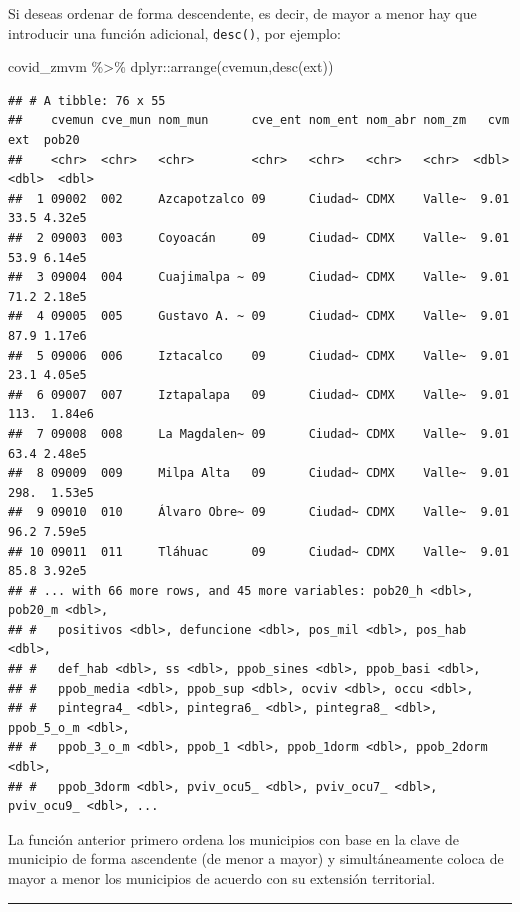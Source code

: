 \documentclass[
  11pt,
  oneside]{book}
\newenvironment{Shaded}{\begin{snugshade}}{\end{snugshade}}
\newcommand{\FunctionTok}[1]{\textcolor[rgb]{0.00,0.00,0.00}{#1}}
\newcommand{\NormalTok}[1]{#1}
\newcommand{\SpecialCharTok}[1]{\textcolor[rgb]{0.00,0.00,0.00}{#1}}
\begin{document}
Si deseas ordenar de forma descendente, es decir, de mayor a menor hay que introducir una función adicional, \texttt{desc()}, por ejemplo:

\begin{Shaded}
\begin{Highlighting}[]
\NormalTok{covid\_zmvm }\SpecialCharTok{\%\textgreater{}\%}\NormalTok{ dplyr}\SpecialCharTok{::}\FunctionTok{arrange}\NormalTok{(cvemun,}\FunctionTok{desc}\NormalTok{(ext))}
\end{Highlighting}
\end{Shaded}

\begin{verbatim}
## # A tibble: 76 x 55
##    cvemun cve_mun nom_mun      cve_ent nom_ent nom_abr nom_zm   cvm   ext  pob20
##    <chr>  <chr>   <chr>        <chr>   <chr>   <chr>   <chr>  <dbl> <dbl>  <dbl>
##  1 09002  002     Azcapotzalco 09      Ciudad~ CDMX    Valle~  9.01  33.5 4.32e5
##  2 09003  003     Coyoacán     09      Ciudad~ CDMX    Valle~  9.01  53.9 6.14e5
##  3 09004  004     Cuajimalpa ~ 09      Ciudad~ CDMX    Valle~  9.01  71.2 2.18e5
##  4 09005  005     Gustavo A. ~ 09      Ciudad~ CDMX    Valle~  9.01  87.9 1.17e6
##  5 09006  006     Iztacalco    09      Ciudad~ CDMX    Valle~  9.01  23.1 4.05e5
##  6 09007  007     Iztapalapa   09      Ciudad~ CDMX    Valle~  9.01 113.  1.84e6
##  7 09008  008     La Magdalen~ 09      Ciudad~ CDMX    Valle~  9.01  63.4 2.48e5
##  8 09009  009     Milpa Alta   09      Ciudad~ CDMX    Valle~  9.01 298.  1.53e5
##  9 09010  010     Álvaro Obre~ 09      Ciudad~ CDMX    Valle~  9.01  96.2 7.59e5
## 10 09011  011     Tláhuac      09      Ciudad~ CDMX    Valle~  9.01  85.8 3.92e5
## # ... with 66 more rows, and 45 more variables: pob20_h <dbl>, pob20_m <dbl>,
## #   positivos <dbl>, defuncione <dbl>, pos_mil <dbl>, pos_hab <dbl>,
## #   def_hab <dbl>, ss <dbl>, ppob_sines <dbl>, ppob_basi <dbl>,
## #   ppob_media <dbl>, ppob_sup <dbl>, ocviv <dbl>, occu <dbl>,
## #   pintegra4_ <dbl>, pintegra6_ <dbl>, pintegra8_ <dbl>, ppob_5_o_m <dbl>,
## #   ppob_3_o_m <dbl>, ppob_1 <dbl>, ppob_1dorm <dbl>, ppob_2dorm <dbl>,
## #   ppob_3dorm <dbl>, pviv_ocu5_ <dbl>, pviv_ocu7_ <dbl>, pviv_ocu9_ <dbl>, ...
\end{verbatim}

La función anterior primero ordena los municipios con base en la clave de municipio de forma ascendente (de menor a mayor) y simultáneamente coloca de mayor a menor los municipios de acuerdo con su extensión territorial.

\begin{center}\rule{0.5\linewidth}{0.5pt}\end{center}
\end{document}
